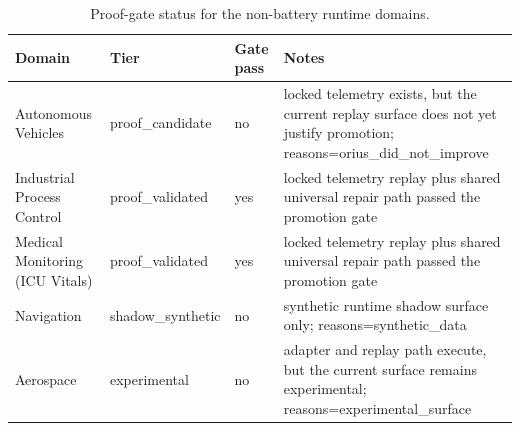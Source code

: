 \begin{table}[htbp]
\centering
\caption{Proof-gate status for the non-battery runtime domains.}
\label{tab:domain-proof-status}
\begin{tabular}{lllp{4.0cm}}
\toprule
Domain & Tier & Gate pass & Notes \\
\midrule
Autonomous Vehicles & proof\_candidate & no & locked telemetry exists, but the current replay surface does not yet justify promotion; reasons=orius\_did\_not\_improve \\
Industrial Process Control & proof\_validated & yes & locked telemetry replay plus shared universal repair path passed the promotion gate \\
Medical Monitoring (ICU Vitals) & proof\_validated & yes & locked telemetry replay plus shared universal repair path passed the promotion gate \\
Navigation & shadow\_synthetic & no & synthetic runtime shadow surface only; reasons=synthetic\_data \\
Aerospace & experimental & no & adapter and replay path execute, but the current surface remains experimental; reasons=experimental\_surface \\
\bottomrule
\end{tabular}
\end{table}
